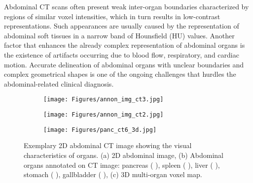 \documentclass[final,5p,times,twocolumn]{elsarticle}
\begin{document}
Abdominal CT scans often present weak inter-organ boundaries characterized by regions of similar voxel intensities, which in turn results in low-contrast representations. Such appearances are usually caused by the representation of abdominal soft tissues in a narrow band of Hounsfield (HU) values. Another factor that enhances the already complex representation of abdominal organs is the existence of artifacts occurring due to blood flow, respiratory, and cardiac motion. Accurate delineation of abdominal organs with unclear boundaries and complex geometrical shapes is one of the ongoing challenges that hurdles the abdominal-related clinical diagnosis. 
\begin{figure}[!h]
\begin{subfigure}[b]{.3\textwidth}
\hspace{-1mm}
\texttt{[image: Figures/annon\_img\_ct3.jpg]} 
\caption{}
\label{fig:sub1}
\end{subfigure}
\begin{subfigure}[b]{.3\textwidth}
\texttt{[image: Figures/annon\_img\_ct2.jpg]} 
\caption{}
\label{fig:sub2}
\end{subfigure}\begin{subfigure}[b]{.3\textwidth}
\texttt{[image: Figures/panc\_ct6\_3d.jpg]} 
\caption{}
\label{fig:sub3}
\end{subfigure}\caption{Exemplary 2D abdominal CT image showing the visual characteristics of organs. (a) 2D abdominal image, (b) Abdominal organs annotated on CT image: pancreas (  ), spleen (  ), liver (  ), stomach (  ), gallbladder (  ), (c) 3D multi-organ voxel map.}\label{fig:ctscan2}
\end{figure}
\end{document}
